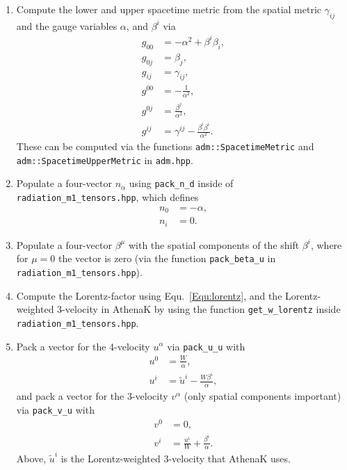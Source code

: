 \documentclass{article}
\newcommand{\var}[1]{%
  {\setlength{\fboxsep}{1.5pt}%
   \colorbox{varbg}{\textcolor{varfg}{\texttt{\small #1}}}}}
\begin{document}
\begin{enumerate}
  \item Compute the lower and upper spacetime metric from the spatial metric $\gamma_{ij}$ and the gauge variables
  $\alpha$, and $\beta^i$ via
  \begin{align}
    g_{00}&=-\alpha^2+\beta^i\beta_i,\nonumber\\
    g_{0j}&=\beta_j,\nonumber\\
    g_{ij}&=\gamma_{ij},\nonumber\\
    g^{00}&=-\frac{1}{\alpha^2},\nonumber\\
    g^{0j}&=\frac{\beta^{j}}{\alpha^2},\nonumber\\
    g^{ij}&=\gamma^{ij}-\frac{\beta^i\beta^i}{\alpha^2}.\nonumber
  \end{align}
  These can be computed via the functions \var{adm::SpacetimeMetric} and \var{adm::SpacetimeUpperMetric} in \var{adm.hpp}.
  \item Populate a four-vector $n_{\alpha}$ using \var{pack\_n\_d} inside of \var{radiation\_m1\_tensors.hpp}, which defines
  \begin{align}
    n_0&=-\alpha,\nonumber\\
    n_i&=0.
  \end{align}
  \item Populate a four-vector $\beta^{\mu}$ with the spatial components of the shift $\beta^i$, where for $\mu=0$ the vector is
  zero (via the function \var{pack\_beta\_u} in \var{radiation\_m1\_tensors.hpp}).
  \item Compute the Lorentz-factor using
  Equ.~\eqref{Equ:lorentz}, and the Lorentz-weighted 3-velocity in AthenaK by using the function \var{get\_w\_lorentz} inside
  \var{radiation\_m1\_tensors.hpp}.
  \item Pack a vector for the 4-velocity $u^{\alpha}$ via \var{pack\_u\_u} with
  \begin{align}
    u^{0}&=\frac{W}{\alpha},\nonumber\\
    u^{i}&=\tilde{u}^i-\frac{W\beta^i}{\alpha},\nonumber
  \end{align}
  and pack a vector for the 3-velocity $v^{\alpha}$ (only spatial components important) via \var{pack\_v\_u} with
  \begin{align}
    v^{0}&=0,\nonumber\\
    v^{i}&=\frac{u^{i}}{W}+\frac{\beta^{i}}{\alpha}.\nonumber
  \end{align}
  Above, $\tilde{u}^i$ is the Lorentz-weighted 3-velocity that AthenaK uses.

\end{enumerate}
\end{document}
